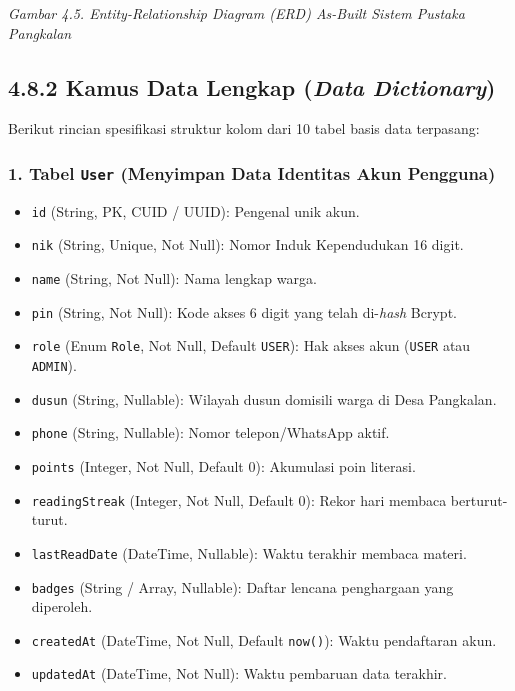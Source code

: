 \documentclass[
  indonesian,
  12pt,
]{report}
\providecommand{\tightlist}{%
  \setlength{\itemsep}{0pt}\setlength{\parskip}{0pt}}
\begin{document}
\emph{Gambar 4.5. Entity-Relationship Diagram (ERD) As-Built Sistem
Pustaka Pangkalan}

\subsection{\texorpdfstring{4.8.2 Kamus Data Lengkap (\emph{Data
Dictionary})}{4.8.2 Kamus Data Lengkap (Data Dictionary)}}\label{kamus-data-lengkap-data-dictionary}

Berikut rincian spesifikasi struktur kolom dari 10 tabel basis data
terpasang:

\subsubsection{\texorpdfstring{1. Tabel \texttt{User} (Menyimpan Data
Identitas Akun
Pengguna)}{1. Tabel User (Menyimpan Data Identitas Akun Pengguna)}}\label{tabel-user-menyimpan-data-identitas-akun-pengguna}

\begin{itemize}
\tightlist
\item
  \texttt{id} (String, PK, CUID / UUID): Pengenal unik akun.
\item
  \texttt{nik} (String, Unique, Not Null): Nomor Induk Kependudukan 16
  digit.
\item
  \texttt{name} (String, Not Null): Nama lengkap warga.
\item
  \texttt{pin} (String, Not Null): Kode akses 6 digit yang telah
  di-\emph{hash} Bcrypt.
\item
  \texttt{role} (Enum \texttt{Role}, Not Null, Default \texttt{USER}):
  Hak akses akun (\texttt{USER} atau \texttt{ADMIN}).
\item
  \texttt{dusun} (String, Nullable): Wilayah dusun domisili warga di
  Desa Pangkalan.
\item
  \texttt{phone} (String, Nullable): Nomor telepon/WhatsApp aktif.
\item
  \texttt{points} (Integer, Not Null, Default 0): Akumulasi poin
  literasi.
\item
  \texttt{readingStreak} (Integer, Not Null, Default 0): Rekor hari
  membaca berturut-turut.
\item
  \texttt{lastReadDate} (DateTime, Nullable): Waktu terakhir membaca
  materi.
\item
  \texttt{badges} (String / Array, Nullable): Daftar lencana penghargaan
  yang diperoleh.
\item
  \texttt{createdAt} (DateTime, Not Null, Default \texttt{now()}): Waktu
  pendaftaran akun.
\item
  \texttt{updatedAt} (DateTime, Not Null): Waktu pembaruan data
  terakhir.
\end{itemize}
\end{document}
